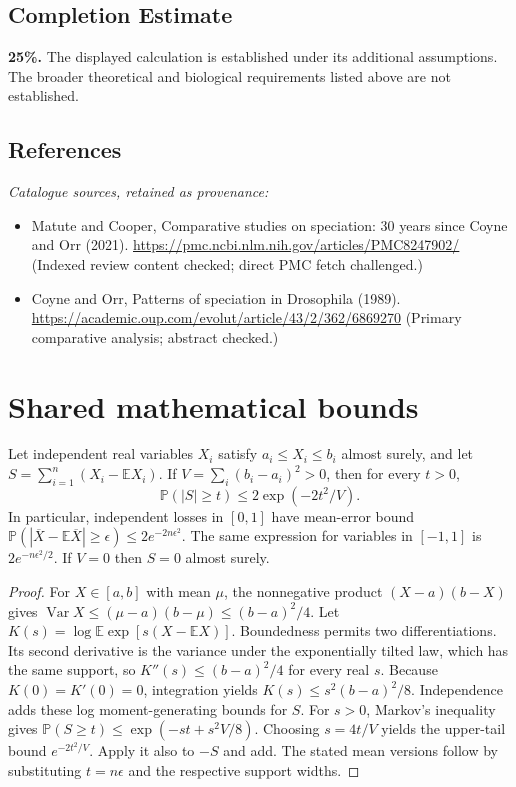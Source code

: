 \documentclass[11pt]{article}
\begin{document}
\subsection{Completion Estimate}
\textbf{25\%.} The displayed calculation is established under its additional assumptions. The broader theoretical and biological requirements listed above are not established.
\subsection{References}
\noindent\emph{Catalogue sources, retained as provenance:}
\begin{itemize}
\item Matute and Cooper, Comparative studies on speciation: 30 years since Coyne and Orr (2021). \url{https://pmc.ncbi.nlm.nih.gov/articles/PMC8247902/} (Indexed review content checked; direct PMC fetch challenged.)
\item Coyne and Orr, Patterns of speciation in Drosophila (1989). \url{https://academic.oup.com/evolut/article/43/2/362/6869270} (Primary comparative analysis; abstract checked.)
\end{itemize}




\section{Shared mathematical bounds}\label{app:bounds}
\begin{lemma}\label{lem:bounded}
Let independent real variables $X_i$ satisfy $a_i\leq X_i\leq b_i$ almost surely,
and let $S=\sum_{i=1}^n(X_i-\mathbb{E} X_i)$. If
$V=\sum_i(b_i-a_i)^2>0$, then for every $t>0$,
\[
 \mathbb{P}(|S|\geq t)\leq 2\exp(-2t^2/V).
\]
In particular, independent losses in $[0,1]$ have mean-error bound
$\mathbb{P}(|\overline X-\mathbb{E}\overline X|\geq\epsilon)
\leq2e^{-2n\epsilon^2}$. The same expression for variables in $[-1,1]$
is $2e^{-n\epsilon^2/2}$. If $V=0$ then $S=0$ almost surely.
\end{lemma}
\begin{proof}
For $X\in[a,b]$ with mean $\mu$, the nonnegative product
$(X-a)(b-X)$ gives
$\operatorname{Var} X\leq(\mu-a)(b-\mu)\leq(b-a)^2/4$.
Let $K(s)=\log\mathbb{E}\exp[s(X-\mathbb{E} X)]$.
Boundedness permits two differentiations. Its second derivative is the variance
under the exponentially tilted law, which has the same support, so
$K''(s)\leq(b-a)^2/4$ for every real $s$.
Because $K(0)=K'(0)=0$, integration yields
$K(s)\leq s^2(b-a)^2/8$.
Independence adds these log moment-generating bounds for $S$.
For $s>0$, Markov's inequality gives
$\mathbb{P}(S\geq t)\leq\exp(-st+s^2V/8)$.
Choosing $s=4t/V$ yields the upper-tail bound $e^{-2t^2/V}$.
Apply it also to $-S$ and add. The stated mean versions follow by substituting
$t=n\epsilon$ and the respective support widths.
\end{proof}
\end{document}
